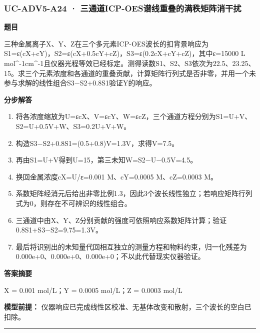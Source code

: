 \documentclass[UTF8,11pt,a4paper]{ctexart}
\begin{document}
\subsubsection*{UC-ADV5-A24 · 三通道ICP-OES谱线重叠的满秩矩阵消干扰}
\noindent\textbf{题目}\par
三种金属离子X、Y、Z在三个多元素ICP-OES波长的扣背景响应为S1=ε(cX+cY)，S2=ε(cX+0.5cY+cZ)，S3=ε(0.2cX+cY+cZ)，其中ε=15000 L mol\textasciicircum{}-1cm\textasciicircum{}-1且仪器光程等效已经标定。测得读数S1、S2、S3依次为22.5、23.25、15。求三个元素浓度和各通道的重叠贡献，计算矩阵行列式是否非零，并用一个未参与求解的线性组合S3−S2+0.8S1验证Y的响应。\par
\medskip\noindent\textbf{分步解答}
\begin{enumerate}
\item 将各浓度缩放为U=εcX、V=εcY、W=εcZ，三个通道方程分别为S1=U+V、S2=U+0.5V+W、S3=0.2U+V+W。
\item 构造S3−S2+0.8S1=(0.5+0.8)V=1.3V，求得V=7.5。
\item 再由S1=U+V得到U=15，第三未知W=S2−U−0.5V=4.5。
\item 换回金属浓度cX=U/ε=0.001 M、cY=0.0005 M、cZ=0.0003 M。
\item 系数矩阵经消元后给出非零比例1.3，因此3个波长线性独立；若响应矩阵行列式为0，则存在不可辨识的线性组合。
\item 三通道中由X、Y、Z分别贡献的强度可依照响应系数矩阵计算；验证0.8S1+S3−S2=9.75=1.3V。
\item 最后将识别出的未知量代回相互独立的测量方程和物料约束，归一化残差为 0.000e+0、0.000e+0、0.000e+0；不以此代替现实仪器验证。
\end{enumerate}
\noindent\textbf{答案摘要}\par
X = 0.001 mol/L；Y = 0.0005 mol/L；Z = 0.0003 mol/L\par
\noindent\textbf{模型前提：}
仪器响应已完成线性区校准、无基体改变和散射，三个波长的空白已扣除。\par
\medskip\hrule\medskip
{}
\end{document}

